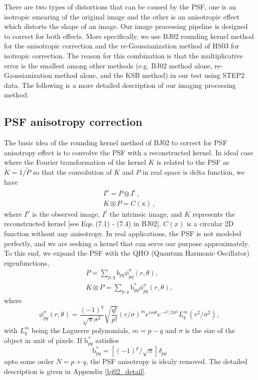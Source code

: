 \documentclass[apj]{emulateapj}
\begin{document}
There are two types of distortions that can be caused by
the PSF, one is an isotropic smearing of the original image 
and the other is an anisotropic effect which distorts 
the shape of an image. Our image processing pipeline 
is designed to correct for both effects.  More specifically,  
we use BJ02 rounding kernel method for the anisotropic 
correction and the re-Gaussianization method of HS03 for 
isotropic correction.  The reason for this combination is that 
 the multiplicative error is the smallest among 
other methods (e.g. BJ02 method alone,
re-Gaussianization method alone, and the KSB method) in our 
test using STEP2 data. The following is a more detailed 
description of our imaging processing method. 

\subsection{PSF anisotropy correction}

The basic idea of the rounding kernel method of BJ02 to correct 
for PSF anisotropy effect is to convolve the PSF with a
reconstructed kernel. In ideal case where the Fourier transformation of the
kernel $K$ is related to the PSF as $\tilde{K}=1/\tilde{P}$ 
so that the convolution of $K$ and $P$ in real space is delta function, we have 
\begin{gather}
I^o=P\otimes I^i \,,\\
K\otimes P=C(\mathrm{x})\,,
\end{gather}
where $I^o$ is the observed image, $I^i$ the intrinsic
image, and $K$ represents the reconstructed kernel 
[see Eqs.\,(7.1) - (7.4) in BJ02]. $C(x)$ is a circular 2D function without any anisotropy.
In real applications, the PSF 
is not modeled perfectly, and we are seeking a kernel that
can serve our purpose approximately.   
To this end, we expand the PSF with the QHO 
(Quantum Harmonic Oscillator) eigenfunctions,
\begin{gather}\label{eq4}
P=\sum_{p,q}b_{pq}\phi_{pq}^{\sigma}(r,\theta),\\
K\otimes P=\sum_{p,q}\mathrm{b}_{pq}^{*}\phi_{pq}^{\sigma}(r,\theta), 
\end{gather}
where 
\begin{equation}
\phi_{pq}^{\sigma}(r,\theta)=\frac{(-1)^q}{\sqrt{\pi}\sigma^{2}}
\sqrt{\frac{q!}{p!}}(r/\sigma)^{m}e^{im\theta}e^{-r^2/2\sigma^{2}}L_q^{m}(r^{2}/\sigma^{2}),
\end{equation}
with $L_q^{m}$ being the Laguerre polynomials, $m=p-q$ and $\sigma$ is the size of the object
in unit of pixels. If $\mathrm{b}_{pq}^*$ satisfies
\begin{equation}
\mathrm{b}_{pq}^*=[(-1)^p/\sqrt{\pi}]\delta_{pq}
\end{equation}
upto some order $N=p+q$, the PSF anisotropy is idealy removed. The detailed description
is given in Appendix \ref{bj02_detail}.
\end{document}
